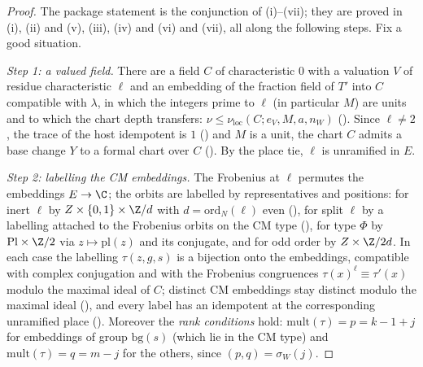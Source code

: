 \begin{proof}
The package statement is the conjunction of (i)--(vii); they are proved in
 (i),
 (ii) and (v),
 (iii),
 (iv) and
 (vi) and (vii), all along the following steps. Fix a good situation.

\emph{Step 1: a valued field.} There are a field $C$ of characteristic $0$ with a valuation $V$ of residue characteristic $\ell$ and
an embedding of the fraction field of $T'$ into $C$ compatible with $\lambda$, in which the integers prime to $\ell$ (in particular
$M$) are units and to which the chart depth transfers: $\nu\le\nu_{\mathrm{loc}}(C;e_V,M,a,n_W)$
(). Since $\ell\ne2$, the trace of the host idempotent is $1$
() and $M$ is a unit, the chart $C$ admits a base change $Y$ to a
formal chart over $C$ (). By the place tie, $\ell$ is unramified in $E$.

\emph{Step 2: labelling the CM embeddings.} The Frobenius at $\ell$ permutes the embeddings $E\to\C$; the orbits are labelled by
representatives and positions: for inert $\ell$ by $Z\times\{0,1\}\times\Z/d$ with $d=\mathrm{ord}_N(\ell)$ even
(), for split $\ell$ by a labelling attached to the Frobenius orbits on the CM type
(), for type $\Phi$ by $\mathrm{Pl}\times\Z/2$ via $z\mapsto
\mathrm{pl}(z)$ and its conjugate, and for odd order by $Z\times\Z/2d$. In each case the labelling $\tau(z,g,s)$ is a bijection
onto the embeddings, compatible with complex conjugation and with the Frobenius congruences $\tau(x)^\ell\equiv\tau'(x)$ modulo the
maximal ideal of $C$; distinct CM embeddings stay distinct modulo the maximal ideal
(), and every label has an idempotent at the
corresponding unramified place (). Moreover the \emph{rank
conditions} hold: $\mathrm{mult}(\tau)=p=k-1+j$ for embeddings of group $\mathrm{bg}(s)$ (which lie in the CM type) and
$\mathrm{mult}(\tau)=q=m-j$ for the others, since $(p,q)=\sigma_W(j)$.


\end{proof}
